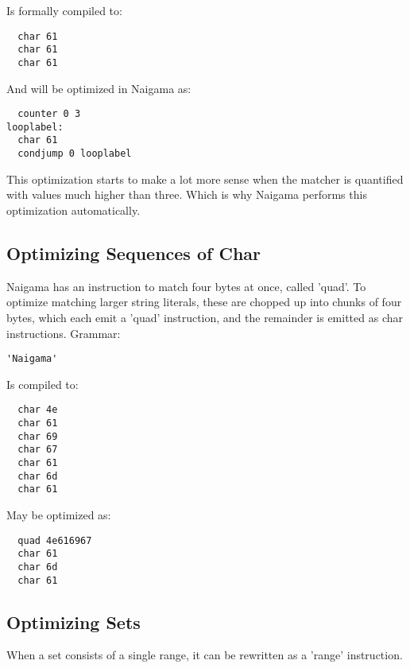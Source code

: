 Is formally compiled to:

\begin{myquote}
\begin{verbatim}
  char 61
  char 61
  char 61
\end{verbatim}
\end{myquote}

And will be optimized in Naigama as:

\begin{myquote}
\begin{verbatim}
  counter 0 3
looplabel:
  char 61
  condjump 0 looplabel
\end{verbatim}
\end{myquote}

This optimization starts to make a lot more sense when the matcher
is quantified with values much higher than three. Which is why
Naigama performs this optimization automatically.

\subsection{Optimizing Sequences of Char}

Naigama has an instruction to match four bytes at once, called 'quad'.
To optimize matching larger string literals, these are chopped up into
chunks of four bytes, which each emit a 'quad' instruction,
and the remainder is emitted as char instructions.
Grammar:

\begin{myquote}
\begin{verbatim}
'Naigama'
\end{verbatim}
\end{myquote}

Is compiled to:

\begin{myquote}
\begin{verbatim}
  char 4e
  char 61
  char 69
  char 67
  char 61
  char 6d
  char 61
\end{verbatim}
\end{myquote}

May be optimized as:

\begin{myquote}
\begin{verbatim}
  quad 4e616967
  char 61
  char 6d
  char 61
\end{verbatim}
\end{myquote}

\subsection{Optimizing Sets}
When a set consists of a single range, it can be rewritten as a 'range'
instruction.

